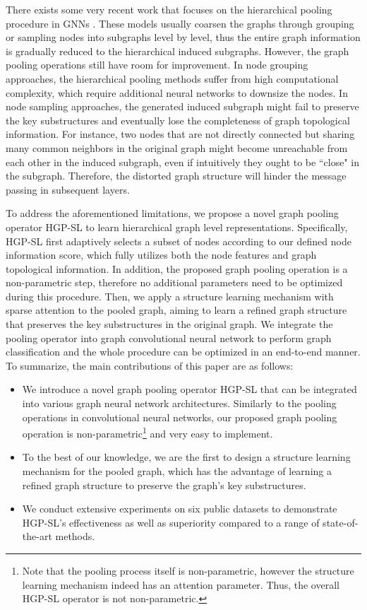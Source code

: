 \documentclass[letterpaper]{article} \usepackage{aaai20}  \usepackage{times}  \usepackage{helvet} \usepackage{courier}  \usepackage[hyphens]{url}  \usepackage{graphicx} \urlstyle{rm} \def\UrlFont{\rm}  \usepackage{graphicx}  \frenchspacing  \setlength{\pdfpagewidth}{8.5in}  \setlength{\pdfpageheight}{11in}
\begin{document}
There exists some very recent work that focuses on the hierarchical pooling procedure in GNNs \cite{ying2018hierarchical,gao2019graph,diehl2019edge,gao2019learning}. These models usually coarsen the graphs through grouping or sampling nodes into subgraphs level by level, thus the entire graph information is gradually reduced to the hierarchical induced subgraphs. However, the graph pooling operations still have room for improvement. In node grouping approaches, the hierarchical pooling methods \cite{ying2018hierarchical,diehl2019edge} suffer from high computational complexity, which require additional neural networks to downsize the nodes. In node sampling approaches, the generated induced subgraph \cite{gao2019graph,lee2019self} might fail to preserve the key substructures and eventually lose the completeness of graph topological information. For instance, two nodes that are not directly connected but sharing many common neighbors in the original graph might become unreachable from each other in the induced subgraph, even if intuitively they ought to be ``close" in the subgraph. Therefore, the distorted graph structure will hinder the message passing in subsequent layers.

To address the aforementioned limitations, we propose a novel graph pooling operator HGP-SL to learn hierarchical graph level representations. Specifically, HGP-SL first adaptively selects a subset of nodes according to our defined node information score, which fully utilizes both the node features and graph topological information. In addition, the proposed graph pooling operation is a non-parametric step, therefore no additional parameters need to be optimized during this procedure. Then, we apply a structure learning mechanism with sparse attention \cite{martins2016softmax} to the pooled graph, aiming to learn a refined graph structure that preserves the key substructures in the original graph. We integrate the pooling operator into graph convolutional neural network to perform graph classification and the whole procedure can be optimized in an end-to-end manner. To summarize, the main contributions of this paper are as follows:
\begin{itemize}
	\item We introduce a novel graph pooling operator HGP-SL that can be integrated into various graph neural network architectures. Similarly to the pooling operations in convolutional neural networks, our proposed graph pooling operation is non-parametric\footnote{Note that the pooling process itself is non-parametric, however the structure learning mechanism indeed has an attention parameter. Thus, the overall HGP-SL operator is not non-parametric.} and very easy to implement. 
	\item To the best of our knowledge, we are the first to design a structure learning mechanism for the pooled graph, which has the advantage of learning a refined graph structure to preserve the graph's key substructures.
	\item We conduct extensive experiments on six public datasets to demonstrate HGP-SL's effectiveness as well as superiority compared to a range of state-of-the-art methods.
\end{itemize}
\end{document}
